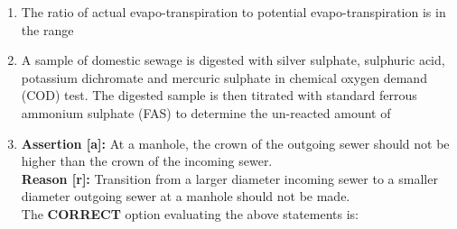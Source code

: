 \documentclass[journal]{IEEEtran}
\numberwithin{equation}{enumi}
\numberwithin{figure}{enumi}
\begin{document}
\begin{enumerate}
\begin{figure}[H]
			\centering
			
			\label{fig:2}
			\caption{}
		\end{figure}
\begin{enumerate}
\end{enumerate}

\item The ratio of actual evapo-transpiration to potential evapo-transpiration is in the range

\begin{enumerate}
\end{enumerate}

\item A sample of domestic sewage is digested with silver sulphate, sulphuric acid, potassium dichromate and mercuric sulphate in chemical oxygen demand (COD) test. The digested sample is then titrated with standard ferrous ammonium sulphate (FAS) to determine the un-reacted amount of

\begin{enumerate}
\end{enumerate}

\item \textbf{Assertion [a]:} At a manhole, the crown of the outgoing sewer should not be higher than the crown of the incoming sewer. \\
\textbf{Reason [r]:}   Transition from a larger diameter incoming sewer to a smaller diameter outgoing sewer at a manhole should not be made. \\
The \textbf{CORRECT} option evaluating the above statements is:


\end{enumerate}
\end{document}
